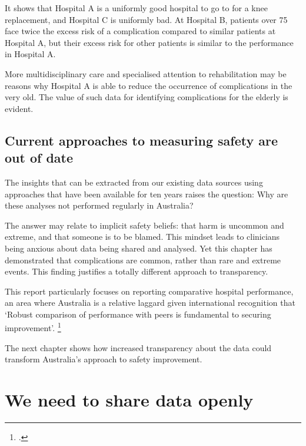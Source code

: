 \documentclass[FrontPage]{grattan}
\begin{document}
It shows that Hospital A is a uniformly good hospital to go to for a knee replacement, and Hospital C is uniformly bad.
At Hospital B, patients over 75 face twice the excess risk of a complication compared to similar patients at Hospital A, but their excess risk for other patients is similar to the performance in Hospital A.

More multidisciplinary care and specialised attention to rehabilitation may be reasons why Hospital A is able to reduce the occurrence of complications in the very old.
The value of such data for identifying complications for the elderly is evident.

\section{Current approaches to measuring safety are out of date}\label{sec:current-approaches-to-measuring-safety-are-out-of-date}

The insights that can be extracted from our existing data sources using approaches that have been available for ten years raises the question: Why are these analyses not performed regularly in Australia?

The answer may relate to implicit safety beliefs: that harm is uncommon and extreme, and that someone is to be blamed.
This mindset leads to clinicians being anxious about data being shared and analysed.
Yet this chapter has demonstrated that complications are common, rather than rare and extreme events.
This finding justifies a totally different approach to transparency.

This report particularly focuses on reporting comparative hospital performance, an area where Australia is a relative laggard given international recognition that `Robust comparison of performance with peers is fundamental to securing improvement'.%
	\footcite{OECD-2017-Health-at-a-glance}

The next chapter shows how increased transparency about the data could transform Australia's approach to safety improvement.
















\chapter{We need to share data openly}\label{chap:we-need-to-share-data-openly}
\end{document}
